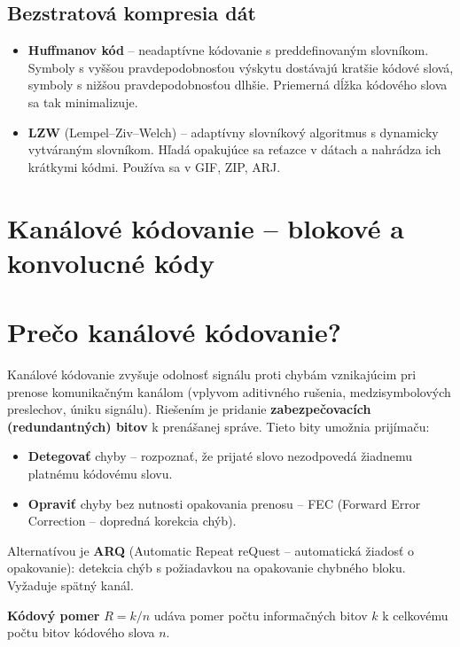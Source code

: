 \subsection{Bezstratová kompresia dát}

\begin{itemize}
    \item \textbf{Huffmanov kód} -- neadaptívne kódovanie s preddefinovaným slovníkom.
        Symboly s vyššou pravdepodobnosťou výskytu dostávajú kratšie kódové slová,
        symboly s nižšou pravdepodobnosťou dlhšie. Priemerná dĺžka kódového slova
        sa tak minimalizuje.
    \item \textbf{LZW} (Lempel--Ziv--Welch) -- adaptívny slovníkový algoritmus
        s dynamicky vytváraným slovníkom. Hľadá opakujúce sa reťazce v dátach
        a nahrádza ich krátkymi kódmi. Používa sa v GIF, ZIP, ARJ.
\end{itemize}

\section{Kanálové kódovanie -- blokové a konvolucné kódy}

\section{Prečo kanálové kódovanie?}

Kanálové kódovanie zvyšuje odolnosť signálu proti chybám vznikajúcim pri prenose
komunikačným kanálom (vplyvom aditivného rušenia, medzisymbolových preslechov,
úniku signálu). Riešením je pridanie \textbf{zabezpečovacích (redundantných) bitov}
k prenášanej správe. Tieto bity umožnia prijímaču:
\begin{itemize}
    \item \textbf{Detegovať} chyby -- rozpoznať, že prijaté slovo nezodpovedá žiadnemu
        platnému kódovému slovu.
    \item \textbf{Opraviť} chyby bez nutnosti opakovania prenosu -- FEC (Forward Error
        Correction -- dopredná korekcia chýb).
\end{itemize}

Alternatívou je \textbf{ARQ} (Automatic Repeat reQuest -- automatická žiadosť
o opakovanie): detekcia chýb s požiadavkou na opakovanie chybného bloku. Vyžaduje
spätný kanál.

\textbf{Kódový pomer} $R = k/n$ udáva pomer počtu informačných bitov $k$ k
celkovému počtu bitov kódového slova $n$.

